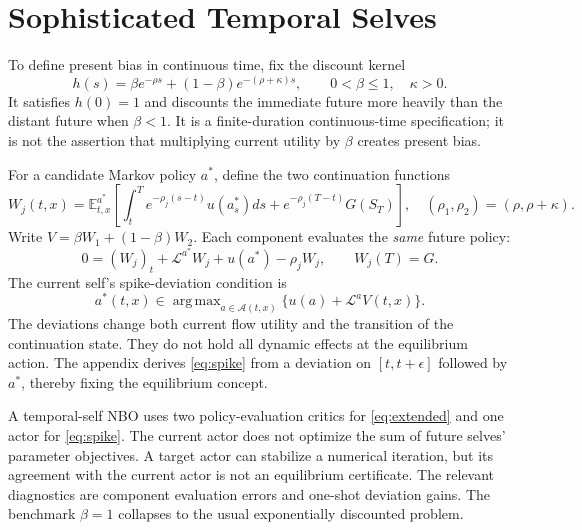 \documentclass[ecta,draft]{econsocart}
\theoremstyle{definition}
\theoremstyle{remark}
\newcommand{\E}{\mathbb E}
\newcommand{\LL}{\mathcal L}
\newcommand{\Act}{\mathcal A}
\DeclareMathOperator*{\argmax}{arg\,max}
\begin{document}
\section{Sophisticated Temporal Selves}\label{sec:temporal}
To define present bias in continuous time, fix the discount kernel
\begin{equation}\label{eq:kernel}
 h(s)=\beta e^{-\rho s}+(1-\beta)e^{-(\rho+\kappa)s},
 \qquad 0<\beta\leq1,\quad\kappa>0.
\end{equation}
It satisfies $h(0)=1$ and discounts the immediate future more heavily than the distant future when $\beta<1$. It is a finite-duration continuous-time specification; it is not the assertion that multiplying current utility by $\beta$ creates present bias.

For a candidate Markov policy $a^*$, define the two continuation functions
\begin{equation}\label{eq:components}
 W_j(t,x)=\E_{t,x}^{a^*}\left[\int_t^T e^{-\rho_j(s-t)}u(a_s^*)ds
             +e^{-\rho_j(T-t)}G(S_T)\right],\quad
 (\rho_1,\rho_2)=(\rho,\rho+\kappa).
\end{equation}
Write $V=\beta W_1+(1-\beta)W_2$. Each component evaluates the \emph{same} future policy:
\begin{equation}\label{eq:extended}
 0=(W_j)_t+\LL^{a^*}W_j+u(a^*)-\rho_jW_j,\qquad W_j(T)=G.
\end{equation}
The current self's spike-deviation condition is
\begin{equation}\label{eq:spike}
 a^*(t,x)\in\argmax_{a\in\Act(t,x)}\{u(a)+\LL^aV(t,x)\}.
\end{equation}
The deviations change both current flow utility and the transition of the continuation state. They do not hold all dynamic effects at the equilibrium action. The appendix derives \eqref{eq:spike} from a deviation on $[t,t+\epsilon]$ followed by $a^*$, thereby fixing the equilibrium concept.

A temporal-self NBO uses two policy-evaluation critics for \eqref{eq:extended} and one actor for \eqref{eq:spike}. The current actor does not optimize the sum of future selves' parameter objectives. A target actor can stabilize a numerical iteration, but its agreement with the current actor is not an equilibrium certificate. The relevant diagnostics are component evaluation errors and one-shot deviation gains. The benchmark $\beta=1$ collapses to the usual exponentially discounted problem.
\end{document}
